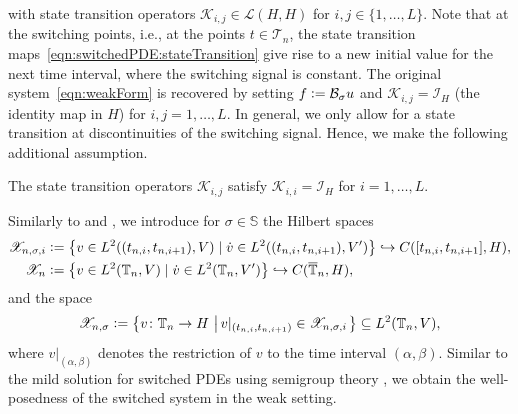 \documentclass[reqno]{amsart}
\newcommand*\closure[1]{\overline{#1}}
\newcommand{\Li}{\mathcal{L}}
\newcommand{\X}{{\mathscr X}}
\newcommand{\timeInt}{\mathbb{T}}
\newcommand{\inpVar}{u}
\newcommand{\bOper}{\calB}
\newcommand{\kOper}{\calK}
\newcommand{\switch}{\sigma}
\newcommand{\nrModes}{L}
\newcommand{\addSwitching}{\mathbb{S}}
\newcommand{\calB}{\mathcal{B}}
\newcommand{\calI}{\mathcal{I}}
\newcommand{\calK}{\mathcal{K}}
\newcommand{\calT}{\mathcal{T}}
\newcommand{\abbr}[1]{\textsf{#1}\xspace}
\newcommand{\PDEs}{\abbr{PDEs}}
\begin{document}
%
with state transition operators $\kOper_{i,j}\in \Li(H,H)$ for $i,j\in\{1,\ldots,\nrModes\}$. Note that at the switching points, i.e., at the points $t\in\calT_n$, the state transition maps~\eqref{eqn:switchedPDE:stateTransition} give rise to a new initial value for the next time interval, where the switching signal is constant. The original system~\eqref{eqn:weakForm} is recovered by setting $f \vcentcolon= \bOper_{\switch}\inpVar$ and $\kOper_{i,j} = \calI_{H}$ (the identity map in $H$) for $i,j=1,\ldots,\nrModes$. In general, we only allow for a state transition at discontinuities of the switching signal. Hence, we make the following additional assumption.

\begin{assumption}
    \label{ass:transitionOperators}
    The state transition operators $\kOper_{i,j}$ satisfy $\kOper_{i,i} = \calI_{H}$ for $i=1,\ldots,\nrModes$.
\end{assumption}

Similarly to \cite{GosPAF18} and \cite{wloka1987partial}, we introduce for $\switch\in\addSwitching$ the Hilbert spaces
\begin{align*}
    \X_{n,\switch,i} &\vcentcolon= \big\{v \in L^2((t_{n,i},t_{n,i+1}),V) \mid \dot{v} \in L^2((t_{n,i},t_{n,i+1}),V')\big\}\hookrightarrow C([t_{n,i},t_{n,i+1}],H),\\
     \X_n &\vcentcolon= \big\{v \in L^2(\timeInt_n,V) \mid \dot{v} \in L^2(\timeInt_n,V')\big\}\hookrightarrow C(\closure{\timeInt}_n,H),
\end{align*}
and the space
\begin{equation}\label{eqn:swi:sol:space}
    \X_{n,\switch} \vcentcolon= \left\{v\colon \timeInt_n\to H\,\left|\, v|_{(t_{n,i},t_{n,i+1})} \in \X_{n,\switch,i}\right.\right\}\subseteq L^2(\timeInt_n,V),
\end{equation}
where $v|_{(\alpha,\beta)}$ denotes the restriction of $v$ to the time interval $(\alpha,\beta)$.
Similar to the mild solution for switched \PDEs using semigroup theory \cite[Lem.~2]{RueH16}, we obtain the well-posedness of the switched system in the weak setting.
\end{document}

